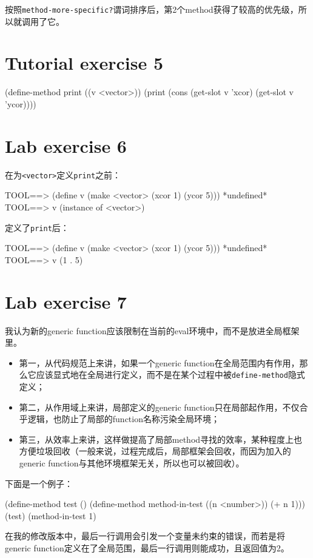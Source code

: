 \documentclass[a4paper]{article}
\newcommand{\code}[1]{\mbox{\tt #1}}
\begin{document}
按照\code{method-more-specific?}谓词排序后，第2个method获得了较高的优先级，所以就调用了它。

\section{Tutorial exercise 5}

\beginlisp
(define-method print ((v <vector>))
  (print (cons 
           (get-slot v 'xcor)
           (get-slot v 'ycor))))
\endlisp

\section{Lab exercise 6}

在为\code{<vector>}定义\code{print}之前：

\beginlisp
TOOL==> (define v (make <vector> (xcor 1) (ycor 5)))
*undefined*
\null
TOOL==> v
(instance of <vector>)
\null
\endlisp

定义了\code{print}后：

\beginlisp
TOOL==> (define v (make <vector> (xcor 1) (ycor 5)))
*undefined*
\null
TOOL==> v
(1 . 5)
\endlisp

\section{Lab exercise 7}

我认为新的generic function应该限制在当前的eval环境中，而不是放进全局框架里。
\begin{itemize}
    \item 第一，从代码规范上来讲，如果一个generic function在全局范围内有作用，那么它应该显式地在全局进行定义，而不是在某个过程中被\code{define-method}隐式定义；
    \item 第二，从作用域上来讲，局部定义的generic function只在局部起作用，不仅合乎逻辑，也防止了局部的function名称污染全局环境；
    \item 第三，从效率上来讲，这样做提高了局部method寻找的效率，某种程度上也方便垃圾回收（一般来说，过程完成后，局部框架会回收，而因为加入的generic function与其他环境框架无关，所以也可以被回收）。
\end{itemize}

下面是一个例子：

\beginlisp
(define-method test ()
  (define-method method-in-test ((n <number>))
    (+ n 1)))
\null
(test)
(method-in-test 1)
\null
\endlisp

在我的修改版本中，最后一行调用会引发一个变量未约束的错误，而若是将generic function定义在了全局范围，最后一行调用则能成功，且返回值为2。
\end{document}
